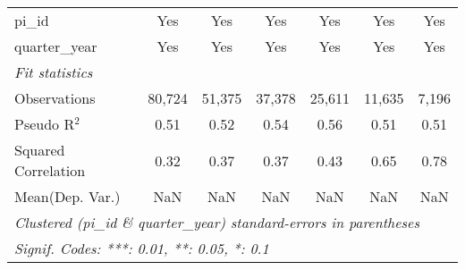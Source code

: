 \begin{tabular}{lcccccc}
   pi\_id                                                     & Yes            & Yes          & Yes          & Yes            & Yes           & Yes\\  
   quarter\_year                                              & Yes            & Yes          & Yes          & Yes            & Yes           & Yes\\  
   \midrule
   \emph{Fit statistics}\\
   Observations                                               & 80,724         & 51,375       & 37,378       & 25,611         & 11,635        & 7,196\\  
   Pseudo R$^2$                                               & 0.51           & 0.52         & 0.54         & 0.56           & 0.51          & 0.51\\  
   Squared Correlation                                        & 0.32           & 0.37         & 0.37         & 0.43           & 0.65          & 0.78\\  
Mean(Dep. Var.) & NaN & NaN & NaN & NaN & NaN & NaN \\
   \midrule \midrule
   \multicolumn{7}{l}{\emph{Clustered (pi\_id \& quarter\_year) standard-errors in parentheses}}\\
   \multicolumn{7}{l}{\emph{Signif. Codes: ***: 0.01, **: 0.05, *: 0.1}}\\
\end{tabular}
\par\endgroup
